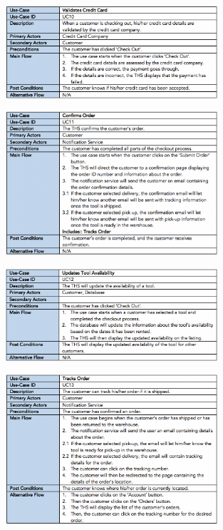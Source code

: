 \begin{figure}[H]
      \centering
      \includegraphics[trim = 0 0 0 0, clip, width=0.7\textwidth]{TempImg/UC10.png}
 \end{figure}

\begin{figure}[H]
      \centering
      \includegraphics[trim = 0 0 0 0, clip, width=0.7\textwidth]{TempImg/UC11.png}
 \end{figure}

\begin{figure}[H]
      \centering
      \includegraphics[trim = 0 0 0 0, clip, width=0.7\textwidth]{TempImg/UC12.png}
 \end{figure}

\begin{figure}[H]
      \centering
      \includegraphics[trim = 0 0 0 0, clip, width=0.7\textwidth]{TempImg/UC13.png}
 \end{figure}

